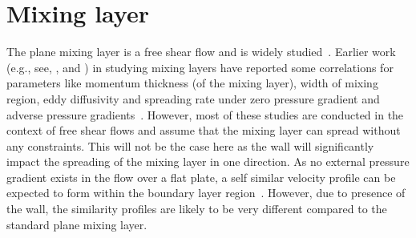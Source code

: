 \section{Mixing layer}\label{sec:mixingres}

The plane mixing layer is a free shear flow and is widely studied~\cite{pope_2000,Schubauer1960}. 
Earlier work (e.g., see, \cite{Rebello1973},\cite{Konig} and \cite{sabin1965analytical}) in studying mixing layers have reported some correlations for parameters like momentum thickness (of the mixing layer), width of mixing region, eddy diffusivity and spreading rate under zero pressure gradient and adverse pressure gradients~\cite{sabin1965analytical, Konig}. 
However, most of these studies are conducted in the context of free shear flows and assume that the mixing layer can spread without any constraints. This will not be the case here as the wall will significantly impact the spreading of the mixing layer in one direction.
As no external pressure gradient exists in the flow over a flat plate, a self similar velocity profile can be expected to form within the boundary layer region~\cite{Rebello1973}. However, due to presence of the wall, the similarity profiles are likely to be very different compared to the standard plane mixing layer.

